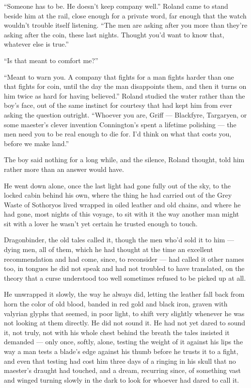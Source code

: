 “Someone has to be. He doesn’t keep company well.” Roland came to stand beside him at the rail, close enough for a private word, far enough that the watch wouldn’t trouble itself listening. “The men are asking after you more than they’re asking after the coin, these last nights. Thought you’d want to know that, whatever else is true.”

“Is that meant to comfort me?”

“Meant to warn you. A company that fights for a man fights harder than one that fights for coin, until the day the man disappoints them, and then it turns on him twice as hard for having believed.” Roland studied the water rather than the boy’s face, out of the same instinct for courtesy that had kept him from ever asking the question outright. “Whoever you are, Griff — Blackfyre, Targaryen, or some maester’s clever invention Connington’s spent a lifetime polishing — the men need you to be real enough to die for. I’d think on what that costs you, before we make land.”

The boy said nothing for a long while, and the silence, Roland thought, told him rather more than an answer would have.

\sceneBreak

He went down alone, once the last light had gone fully out of the sky, to the locked cabin behind his own, where the thing he had carried out of the Grey Waste of Sothoryos lived wrapped in oiled leather and old chains, and where he had gone, most nights of this voyage, to sit with it the way another man might sit with a lover he wasn’t yet certain he trusted enough to touch.

Dragonbinder, the old tales called it, though the men who’d sold it to him — dying men, all of them, which he had thought at the time an excellent recommendation and had come, since, to reconsider — had called it other names too, in tongues he did not speak and had not troubled to have translated, on the theory that a curse understood too well sometimes refused to be picked up at all.

He unwrapped it slowly, the way he always did, letting the leather fall back from horn the color of old blood, banded in red gold and black iron, graven with valyrian glyphs that seemed, in poor light, to shift very slightly whenever he was not looking at them directly. He did not sound it. He had not yet dared to sound it, not truly, not with his whole chest behind the breath the tales insisted it demanded — only once, softly, alone, testing the weight of it against his lips the way a man tests a blade’s edge against his thumb before he trusts it to a fight, and even that testing had cost him three days of a ringing in his skull that no maester’s draught had touched, and a dream, recurring since, of something vast and winged turning slowly in the dark to look for whoever had dared to call it.

